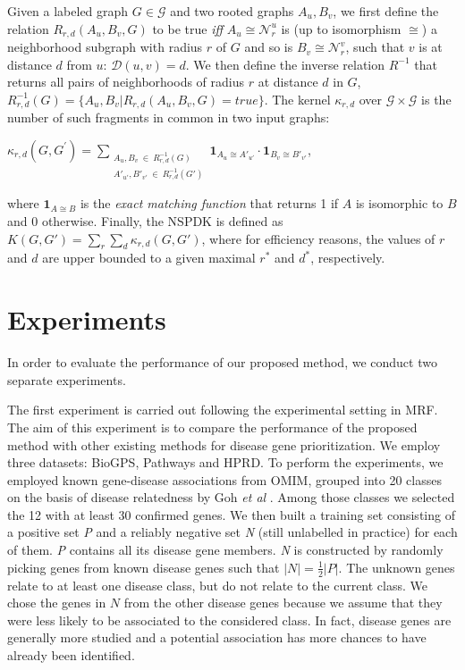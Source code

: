 Given a labeled graph $G \in \mathcal{G}$ and two rooted graphs $A_u, B_v$, we first define the relation $R_{r,d}(A_u, B_v, G)$ to be true {\em iff} $A_u \cong \mathcal{N}_r^u$ is (up to isomorphism $\cong$) a neighborhood subgraph with radius $r$ of $G$ and so is $B_v \cong  \mathcal{N}_r^v$, such that $v$ is at distance $d$ from $u$: $\mathcal{D}(u,v)= d$. We then define the inverse relation $R^{-1}$ that returns all pairs of neighborhoods of radius $r$ at distance $d$ in $G$, $R^{-1}_{r,d}(G) = \lbrace A_u, B_v | R_{r,d}(A_u,B_v,G)=true\rbrace$. The kernel $\kappa_{r,d}$ over $\mathcal{G} \times \mathcal{G}$ is the number of such fragments in common in two input graphs:
\begin{center}
$\kappa_{r,d}(G,G^{'}) = 
\!\!\!\!\!\!\!\!\!\!\!\! 
\sum\limits_{\substack{A_u, B_v \ \in \ R_{r,d}^{-1}(G) \\ 
{A'}_{u'}, {B'}_{v'} \ \in \ R_{r,d}^{-1}(G')
}} \!\!\!\!\!\!\!\!\!\!\!\!  { { \textbf{1}_{A_{u} \cong A'_{u'}}} \cdot {
\textbf{1}_{B_{v} \cong B'_{v'}}} }$, 
\end{center}
\noindent where $\textbf{1}_{A \cong B}$ is the \textit{exact matching function} that returns 1 if $A$ is isomorphic to $B$ and 0 otherwise. Finally, the NSPDK is defined as $K(G,G') = \sum\limits_{r}{\sum\limits_{d}{\kappa_{r,d}(G,G')}}$, where for efficiency reasons, the values of $r$ and $d$ are upper bounded to a given maximal $r^*$ and $d^*$, respectively.

\section{Experiments}
In order to evaluate the performance of our proposed method, we conduct two separate experiments. 

The first experiment is carried out following the experimental setting in MRF. The aim of this experiment is to compare the performance of the proposed method with other existing methods for disease gene prioritization. We employ three datasets: BioGPS, Pathways and HPRD. To perform the experiments, we employed known gene-disease associations from OMIM, grouped into 20 classes on the basis of disease relatedness by Goh \emph{et al} \cite{goh}. Among those classes we selected the 12 with at least 30 confirmed genes. We then built a training set consisting of a positive set \textit{P} and a reliably negative set \textit{N} (still unlabelled in practice) for each of them. \textit{P} contains all its disease gene members. \textit{N} is constructed by randomly picking genes from known disease genes such that $\vert N \vert = \frac{1}{2} \vert P \vert$. The unknown genes relate to at least one disease class, but do not relate to the current class. We chose the genes in $N$ from the other disease genes because we assume that they were less likely to be associated to the considered class. In fact, disease genes are generally more studied and a potential association has more chances to have already been identified.

